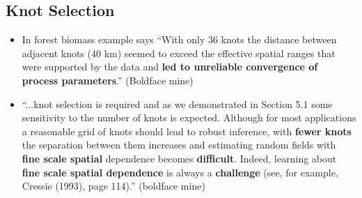 \documentclass{article}
\begin{document}
\subsection*{Knot Selection} %
\citep{Banerjee2008}
\begin{itemize}
\item In forest biomass example \cite{Banerjee2008} says ``With only 36 knots the distance between adjacent knots (40 km) seemed to exceed the effective spatial ranges that were supported by the data and {\bf led to unreliable convergence of process parameters}.'' (Boldface mine)
\item ``...knot selection is required and as we demonstrated in Section 5.1 some sensitivity to the number of knots is expected. Although for most applications a reasonable grid of knots should lead to robust inference, with {\bf fewer knots} the separation between them increases and estimating random fields with {\bf fine scale spatial} dependence becomes {\bf difficult}. Indeed, learning about {\bf fine scale spatial dependence} is always a {\bf challenge} (see, for example, Cressie (1993), page 114).'' (boldface mine)
\end{itemize}
\end{document}
